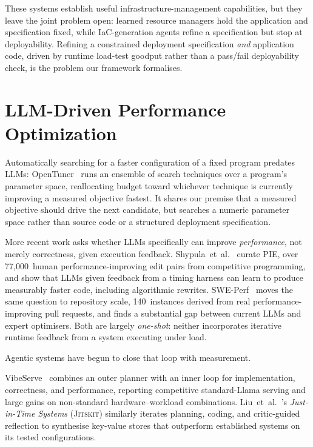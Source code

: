 These systems establish useful infrastructure-management capabilities, but
they leave the joint problem open: learned resource managers hold the
application and specification fixed, while IaC-generation agents refine a
specification but stop at deployability. Refining a constrained deployment
specification \emph{and} application code, driven by runtime load-test
goodput rather than a pass/fail deployability check, is the problem our
framework formalises.


\section{LLM-Driven Performance Optimization}
\label{sec:rw-llm-perf}

Automatically searching for a faster configuration of a fixed program
predates LLMs: OpenTuner~\cite{ansel2014opentuner} runs an ensemble of
search techniques over a program's parameter space, reallocating budget
toward whichever technique is currently improving a measured objective
fastest.  It shares our premise that a measured objective should drive the
next candidate, but searches a numeric parameter space rather than source
code or a structured deployment specification.

More recent work asks whether LLMs specifically can improve
\emph{performance}, not merely correctness, given execution feedback.
Shypula~et~al.~\cite{shypula2024pie} curate PIE, over 77{,}000~human
performance-improving edit pairs from competitive programming, and show that
LLMs given feedback from a timing harness can learn to produce measurably
faster code, including algorithmic rewrites.  SWE-Perf~\cite{he2025sweperf}
moves the same question to repository scale, 140~instances derived from real
performance-improving pull requests, and finds a substantial gap between
current LLMs and expert optimisers.  Both are largely \emph{one-shot}:
neither incorporates iterative runtime feedback from a system executing
under load.

Agentic systems have begun to close that loop with measurement.\par
VibeServe~\cite{kamahori2025vibeserve} combines an outer planner with an
inner loop for implementation, correctness, and performance, reporting
competitive standard-Llama serving and large gains on non-standard
hardware--workload combinations. Liu~et~al.~\cite{liu2025jitsystems}'s
\emph{Just-in-Time Systems} (\textsc{Jitskit}) similarly iterates planning,
coding, and critic-guided reflection to synthesise key-value stores that
outperform established systems on its tested configurations.

